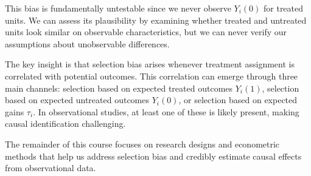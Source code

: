 \documentclass[12pt]{article}
\begin{document}
\begin{multicols}{2}
This bias is fundamentally untestable since we never observe $Y_i(0)$ for treated units.
We can assess its plausibility by examining whether treated and untreated units look similar on observable characteristics, but we can never verify our assumptions about unobservable differences.

The key insight is that selection bias arises whenever treatment assignment is correlated with potential outcomes.
This correlation can emerge through three main channels: selection based on expected treated outcomes $Y_i(1)$, selection based on expected untreated outcomes $Y_i(0)$, or selection based on expected gains $\tau_i$.
In observational studies, at least one of these is likely present, making causal identification challenging.

The remainder of this course focuses on research designs and econometric methods that help us address selection bias and credibly estimate causal effects from observational data.

\end{multicols}
\end{document}
